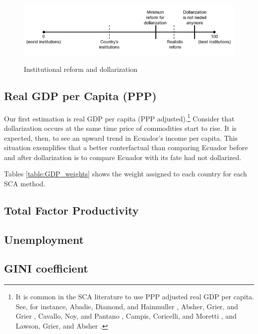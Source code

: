 \documentclass[12pt]{article}
\begin{document}
\begin{figure}[!htbp]
    \caption{Institutional reform and dollarization}
    \centering
    \includegraphics{Fig_01.png}
    \label{fig:SCA_GDP}
\end{figure}



\subsection{Real GDP per Capita (PPP)}

Our first estimation is real GDP per capita (PPP adjusted).\footnote{It is common in the SCA literature to use PPP adjusted real GDP per capita. See, for instance, Abadie, Diamond, and Hainmuller \parencite*{Abadie2015}, Absher, Grier, and Grier \parencite*{Absher2020}, Cavallo, Noy, and Pantano \parencite*{Cavallo2013}, Campis, Coricelli, and Moretti \parencite*{Campos2019}, and Lawson, Grier, and Absher \parencite*{Lawson2019}.} Consider that dollarization occurs at the same time price of commodities start to rise. It is expected, then, to see an upward trend in Ecuador's income per capita. This situation exemplifies that a better conterfactual than comparing Ecuador before and after dollarization is to compare Ecuador with its fate had not dollarized. 

Tables \ref{table:GDP_weights} shows the weight assigned to each country for each SCA method. 





\subsection{Total Factor Productivity}

\subsection{Unemployment}

\subsection{GINI coefficient}



\newpage
\singlespacing
\printbibliography


\end{document}
